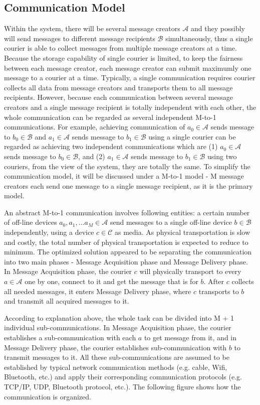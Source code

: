 \subsection{Communication Model}
Within the system, there will be several message creators $ \mathcal{A} $ and they possibly will send messages to different message recipients $ \mathcal{B} $ simultaneously, thus a single courier is able to collect messages from multiple message creators at a time. Because the storage capability of single courier is limited, to keep the fairness between each message creator, each message creator can submit maximumly one message to a courier at a time. Typically, a single communication requires courier collects all data from message creators and transports them to all message recipients. However, because each communication between several message creators and a single message recipient is totally independent with each other, the whole communication can be regarded as several independent M-to-1 communications. For example, achieving communication of $a_0 \in \mathcal{A}$ sends message to $ b_0 \in \mathcal{B} $ and $a_1 \in \mathcal{A}$ sends message to $ b_1 \in \mathcal{B} $ using a single courier can be regarded as achieving two independent communications which are (1) $a_0 \in \mathcal{A}$ sends message to $ b_0 \in \mathcal{B} $, and (2) $a_1 \in \mathcal{A}$ sends message to $ b_1 \in \mathcal{B} $ using two couriers, from the view of the system, they are totally the same. To simplify the communication model, it will be discussed under a M-to-1 model - M message creators each send one message to a single message recipient, as it is the primary model.

An abstract M-to-1 communication involves following entities: a certain number of off-line devices $a_0, a_1, ... a_M \in \mathcal{A}$ send messages to a single off-line device $b \in \mathcal{B}$ independently, using a device $c \in \mathcal{C}$ as media. As physical transportation is slow and costly, the total number of physical transportation is expected to reduce to minimum. The optimized solution appeared to be separating the communication into two main phases - Message Acquisition phase and Message Delivery phase. In Message Acquisition phase, the courier $c$ will physically transport to every $a \in \mathcal{A}$ one by one, connect to it and get the message that is for $b$. After $c$ collects all needed messages, it enters Message Delivery phase, where $c$ transports to $b$ and transmit all acquired messages to it.

According to explanation above, the whole task can be divided into M + 1 individual sub-communications. In Message Acquisition phase, the courier establishes a sub-communication with each $a$ to get message from it, and in Message Delivery phase, the courier establishes sub-communication with $b$ to transmit messages to it. All these sub-communications are assumed to be established by typical network communication methods (e.g. cable, Wifi, Bluetooth, etc.) and apply their corresponding communication protocols (e.g. TCP/IP, UDP, Bluetooth protocol, etc.). The following figure shows how the communication is organized.

